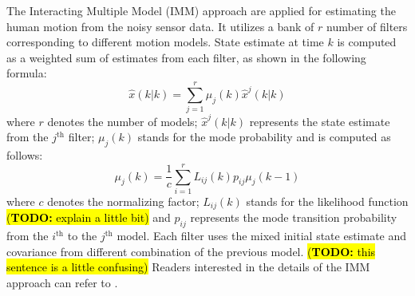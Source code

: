 \documentclass[letterpaper, 10 pt, conference]{ieeeconf}
\newcommand{\todohere}[1]{\hl{(\textbf{TODO:} #1)}}
\begin{document}
	The Interacting Multiple Model (IMM) approach are applied for estimating the human motion from the noisy sensor data.
	It utilizes a bank of $r$ number of filters corresponding to different motion models.
	State estimate at time $k$ is computed as a weighted sum of estimates from each filter, as shown in the following formula:
	\[
	\hat{x}(k|k)=\sum\limits_{j=1}^{r}\mu_j(k)\hat{x}^j(k|k)
	\]
	where $r$ denotes the number of models; $\hat{x}^j(k|k)$ represents the state estimate from the $j^\text{th}$ filter; $\mu_j(k)$ stands for the mode probability and is computed as follows:
	\[
	\mu_j(k)=\frac{1}{c}\sum\limits_{i=1}^{r}L_{ij}(k)p_{ij}\mu_j(k-1)
	\]
	where $c$ denotes the normalizing factor; $L_{ij}(k)$ stands for the likelihood function \todohere{explain a little bit} and $p_{ij}$ represents the mode transition probability from the $i^\text{th}$ to the $j^\text{th}$ model. 
	Each filter uses the mixed initial state estimate and covariance from different combination of the previous model. \todohere{this sentence is a little confusing}
	Readers interested in the details of the IMM approach can refer to \cite{yaakov2001estimation}.
	
\end{document}
